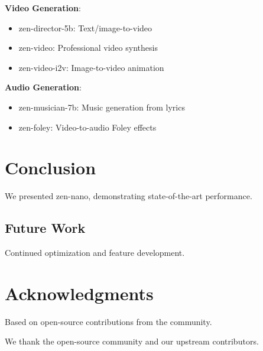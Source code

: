 \documentclass[11pt,a4paper]{article}
\begin{document}
\textbf{Video Generation}:
\begin{itemize}
    \item zen-director-5b: Text/image-to-video
    \item zen-video: Professional video synthesis
    \item zen-video-i2v: Image-to-video animation
\end{itemize}

\textbf{Audio Generation}:
\begin{itemize}
    \item zen-musician-7b: Music generation from lyrics
    \item zen-foley: Video-to-audio Foley effects
\end{itemize}

\section{Conclusion}

We presented zen-nano, demonstrating state-of-the-art performance.

\subsection{Future Work}
Continued optimization and feature development.

\section*{Acknowledgments}

Based on open-source contributions from the community.

We thank the open-source community and our upstream contributors.



\end{document}
